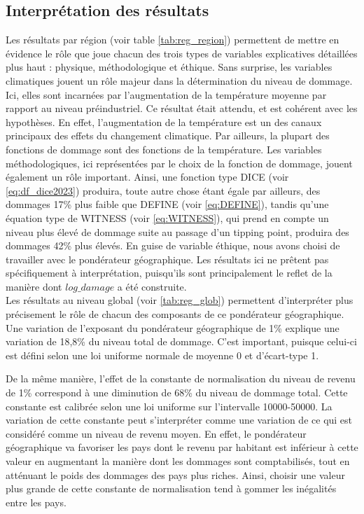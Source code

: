 \subsection{Interprétation des résultats}


Les résultats par région (voir table \ref{tab:reg_region}) permettent de mettre en évidence le rôle que joue chacun des trois types de variables explicatives détaillées plus haut : physique, méthodologique et éthique. 
Sans surprise, les variables climatiques jouent un rôle majeur dans la détermination du niveau de dommage. Ici, elles sont incarnées par l'augmentation de la température moyenne par rapport au niveau préindustriel. Ce résultat était attendu, et est cohérent avec les hypothèses. En effet, l'augmentation de la température est un des canaux principaux des effets du changement climatique. Par ailleurs, la plupart des fonctions de dommage sont des fonctions de la température. 
Les variables méthodologiques, ici représentées par le choix de la fonction de dommage, jouent également un rôle important. Ainsi, une fonction type DICE (voir \ref{eq:df_dice2023}) produira, toute autre chose étant égale par ailleurs, des dommages 17\% plus faible que DEFINE (voir \ref{eq:DEFINE}), tandis qu'une équation type de WITNESS (voir \ref{eq:WITNESS}), qui prend en compte un niveau plus élevé de dommage suite au passage d'un tipping point, produira des dommages 42\% plus élevés. 
En guise de variable éthique, nous avons choisi de travailler avec le pondérateur géographique. Les résultats ici ne prêtent pas spécifiquement à interprétation, puisqu'ils sont principalement le reflet de la manière dont $log\_damage$ a été construite. \\

Les résultats au niveau global (voir \ref{tab:reg_glob}) permettent d'interpréter plus précisement le rôle de chacun des composants de ce pondérateur géographique. Une variation de l'exposant du pondérateur géographique de 1\% explique une variation de 18,8\% du niveau total de dommage. C'est important, puisque celui-ci est défini selon une loi uniforme normale de moyenne 0 et d'écart-type 1.

De la même manière, l'effet de la constante de normalisation du niveau de revenu de 1\% correspond à une diminution de 68\% du niveau de dommage
total. Cette constante est calibrée selon une loi uniforme sur l'intervalle 10000-50000. La variation de cette constante peut s'interpréter comme une variation de ce qui est considéré comme un niveau de revenu moyen. En effet, le pondérateur géographique va favoriser les pays dont le revenu par habitant est inférieur à cette valeur en augmentant la manière dont les dommages sont comptabilisés, tout en atténuant le poids des dommages des pays plus riches. Ainsi, choisir une valeur plus grande de cette constante de normalisation tend à gommer les inégalités entre les pays. 

